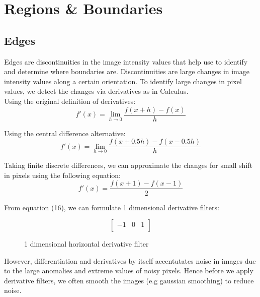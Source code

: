 \documentclass[12pt]{article}
\begin{document}
\section{Regions \& Boundaries}

\subsection{Edges}

Edges are discontinuities in the image intensity values that help use to identify and determine where boundaries are. Discontinuities are large changes in image intensity values along a certain orientation. To identify large changes in pixel values, we detect the changes via derivatives as in Calculus.\\ 

Using the original definition of derivatives:
\begin{equation}
f'(x) = \lim_{h \rightarrow 0} \frac{f(x + h) - f(x)}{h}
\end{equation} 

Using the central difference alternative:
\begin{equation}
f'(x) = \lim_{h \rightarrow 0} \frac{f(x + 0.5 h) - f(x - 0.5 h)}{h}
\end{equation} 

Taking finite discrete differences, we can approximate the changes for small shift in pixels using the following equation:
\begin{equation}
f'(x) =  \frac{f(x + 1) - f(x - 1)}{2}
\end{equation} 

From equation (16), we can formulate 1 dimensional derivative filters: 
\begin{figure}[!ht]
\begin{equation}
\begin{bmatrix}
-1 & 0 & 1\\
\end{bmatrix}
\end{equation}
\caption{1 dimensional horizontal derivative filter}
\end{figure} 

However, differentiation and derivatives by itself accentutates noise in images due to the large anomalies and extreme values of noisy pixels. Hence before we apply derivative filters, we often smooth the images (e.g gaussian smoothing) to reduce noise.
\end{document}
